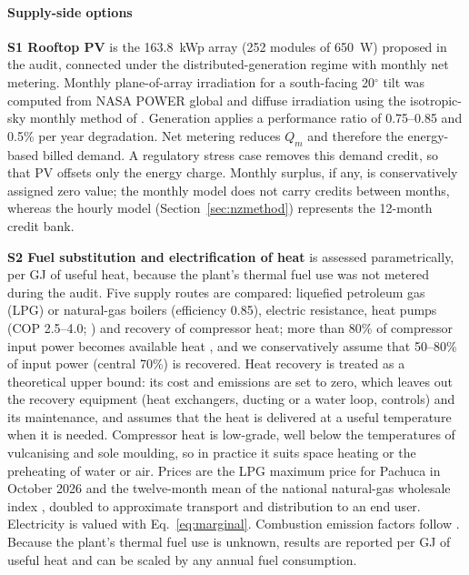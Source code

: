 \documentclass[preprint,12pt,authoryear]{elsarticle}
\begin{document}
\paragraph{Supply-side options}
\textbf{S1 Rooftop PV} is the 163.8~kWp array (252 modules of 650~W) proposed in the audit, connected under the distributed-generation regime with monthly net metering. Monthly plane-of-array irradiation for a south-facing 20$^\circ$ tilt was computed from NASA POWER global and diffuse irradiation using the isotropic-sky monthly method of \citet{klein1977}. Generation applies a performance ratio of 0.75--0.85 \citep{reich2012} and 0.5\% per year degradation. Net metering reduces $Q_m$ and therefore the energy-based billed demand. A regulatory stress case removes this demand credit, so that PV offsets only the energy charge. Monthly surplus, if any, is conservatively assigned zero value; the monthly model does not carry credits between months, whereas the hourly model (Section~\ref{sec:nzmethod}) represents the 12-month credit bank.

\textbf{S2 Fuel substitution and electrification of heat} is assessed parametrically, per GJ of useful heat, because the plant's thermal fuel use was not metered during the audit. Five supply routes are compared: liquefied petroleum gas (LPG) or natural-gas boilers (efficiency 0.85), electric resistance, heat pumps (COP 2.5--4.0; \citealp{arpagaus2018,schlosser2020}) and recovery of compressor heat; more than 80\% of compressor input power becomes available heat \citep{doe2016compressed}, and we conservatively assume that 50--80\% of input power (central 70\%) is recovered. Heat recovery is treated as a theoretical upper bound: its cost and emissions are set to zero, which leaves out the recovery equipment (heat exchangers, ducting or a water loop, controls) and its maintenance, and assumes that the heat is delivered at a useful temperature when it is needed. Compressor heat is low-grade, well below the temperatures of vulcanising and sole moulding, so in practice it suits space heating or the preheating of water or air. Prices are the LPG maximum price for Pachuca in October 2026 \citep{profeco2026lpg} and the twelve-month mean of the national natural-gas wholesale index \citep{cne2026ipgn}, doubled to approximate transport and distribution to an end user. Electricity is valued with Eq.~\eqref{eq:marginal}. Combustion emission factors follow \citet{ipcc2006}. Because the plant's thermal fuel use is unknown, results are reported per GJ of useful heat and can be scaled by any annual fuel consumption.
\end{document}
